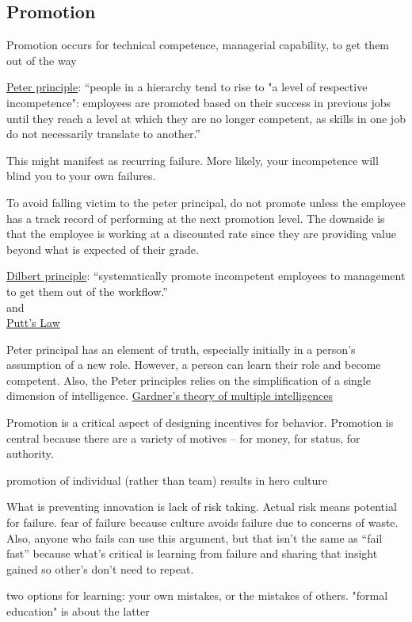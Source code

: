 \subsection{Promotion\label{sec:promotion}}

Promotion occurs for technical competence, managerial capability, to get them out of the way 


\href{https://en.wikipedia.org/wiki/Peter_principle}{Peter principle}: ``people in a hierarchy tend to rise to "a level of respective incompetence": employees are promoted based on their success in previous jobs until they reach a level at which they are no longer competent, as skills in one job do not necessarily translate to another.''

This might manifest as recurring failure. More likely, your incompetence will blind you to your own failures.

To avoid falling victim to the peter principal, do not promote unless the employee has a track record of performing at the next promotion level. The downside is that the employee is working at a discounted rate since they are providing value beyond what is expected of their grade.


\href{https://en.wikipedia.org/wiki/Dilbert_principle}{Dilbert principle}: ``systematically promote incompetent employees to management to get them out of the workflow.''\\
and\\
\href{https://en.wikipedia.org/wiki/Putt\%27s_Law_and_the_Successful_Technocrat}{Putt's Law}





Peter principal \cite{1970_Peter} has an element of truth, especially initially in a person's assumption of a new role. However, a person can learn their role and become competent. Also, the Peter principles relies on the simplification of a single dimension of intelligence. 
\href{https://en.wikipedia.org/wiki/Theory_of_multiple_intelligences}{Gardner's theory of multiple intelligences}


Promotion is a critical aspect of designing incentives for behavior. Promotion is central because there are a variety of motives -- for money, for status, for authority. 

promotion of individual (rather than team) results in hero culture

What is preventing innovation is lack of risk taking. Actual risk means potential for failure. fear of failure because culture avoids failure due to concerns of waste. Also, anyone who fails can use this argument, but that isn't the same as ``fail fast'' because what's critical is learning from failure and sharing that insight gained so other's don't need to repeat. 

two options for learning: your own mistakes, or the mistakes of others. "formal education" is about the latter
